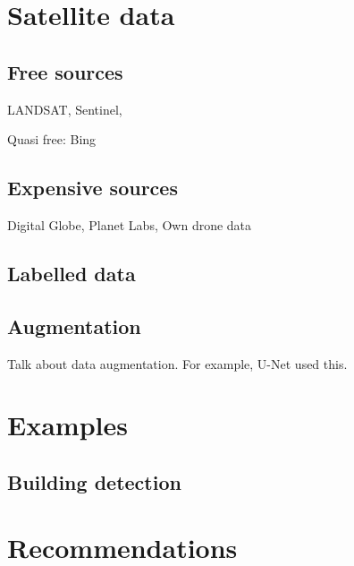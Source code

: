 \documentclass[12pt, a4paper, oneside, headinclude, footinclude]{article}
\begin{document}
\section{Satellite data}

\subsection{Free sources}

LANDSAT, Sentinel, 

Quasi free: Bing

\subsection{Expensive sources}

Digital Globe, Planet Labs, Own drone data

\subsection{Labelled data}

\subsection{Augmentation}

Talk about data augmentation. For example, U-Net used this.

\section{Examples}

\subsection{Building detection}

\section{Recommendations}


\renewcommand{\refname}{\spacedlowsmallcaps{References}} 





\end{document}
